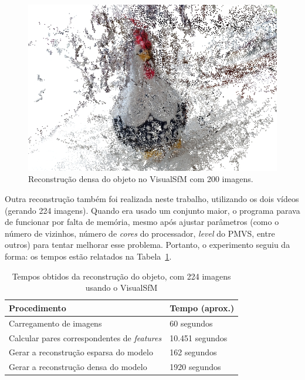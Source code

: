 \begin{figure}[!h]
	\centering
	\includegraphics[width=\linewidth]{figs/galinhadense.jpg}
	\caption{%
	Reconstrução densa do objeto no VisualSfM com 200 imagens.
	}\label{fig:reconstrucaoDensaVisualSFM}
\end{figure}

Outra reconstrução também foi realizada neste trabalho, utilizando os dois
vídeos (gerando 224 imagens).  Quando era usado um conjunto maior, o programa
parava de funcionar por falta de memória, mesmo após ajustar parâmetros (como o
número de vizinhos, número de \emph{cores} do processador, \emph{level} do PMVS,
entre outros) para tentar melhorar esse problema. Portanto, o experimento seguiu da
forma: os tempos estão relatados na Tabela~\ref{tab:temposSfM224}.
\begin{table}[h!]
\caption{Tempos obtidos da reconstrução do objeto, com 224 imagens usando o VisualSfM}
\label{tab:temposSfM224}
\begin{tabular}{|l|p{4.7cm}|}
\hline
Procedimento & Tempo (aprox.) \\ \hline
Carregamento de imagens & 60 segundos \\ \hline
Calcular pares correspondentes de \emph{features} & 10.451 segundos \\ \hline
Gerar a reconstrução esparsa do modelo & 162 segundos \\ \hline
Gerar a reconstrução densa do modelo & 1920 segundos \\ \hline
\end{tabular}
\end{table}

